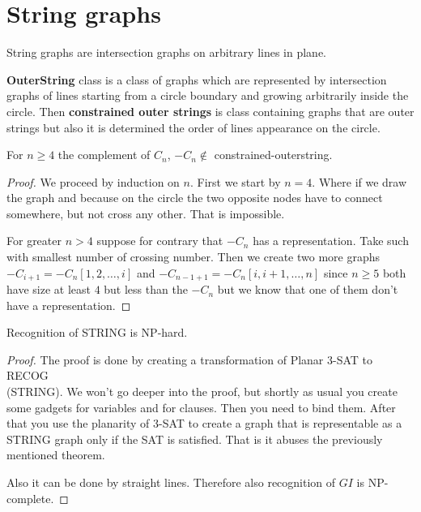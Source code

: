 \chapter{String graphs}

\begin{defn}
	String graphs are intersection graphs on arbitrary lines in plane.
\end{defn}

\begin{defn}
	\textbf{OuterString} class is a class of graphs which are represented by intersection graphs of lines starting from a circle boundary and growing arbitrarily inside the circle. Then \textbf{constrained outer strings} is class containing graphs that are outer strings but also it is determined the order of lines appearance on the circle.
\end{defn}


\begin{thm}
	For $n \geq 4$ the complement of $C_n$, $-C_n \notin$ constrained-outerstring.
\end{thm}

\begin{proof}
	We proceed by induction on $n$. First we start by $n = 4$. Where if we draw the graph and because on the circle the two opposite nodes have to connect somewhere, but not cross any other. That is impossible.
	
	For greater $n > 4$ suppose for contrary that $-C_n$ has a representation. Take such with smallest number of crossing number. Then we create two more graphs $-C_{i+1} = -C_n[1,2, \dots, i]$ and $-C_{n-1+1} = -C_n[i, i+1, \dots, n]$ since $n \geq 5$ both have size at least $4$ but less than the $-C_n$ but we know that one of them don't have a representation.
\end{proof}

\begin{thm}
	Recognition of STRING is NP-hard.
\end{thm}

\begin{proof}
	The proof is done by creating a transformation of Planar 3-SAT to RECOG\\(STRING). We won't go deeper into the proof, but shortly as usual you create some gadgets for variables and for clauses. Then you need to bind them. After that you use the planarity of 3-SAT to create a graph that is representable as a STRING graph only if the SAT is satisfied. That is it abuses the previously mentioned theorem.
	
	Also it can be done by straight lines. Therefore also recognition of $GI$ is NP-complete.
\end{proof}

